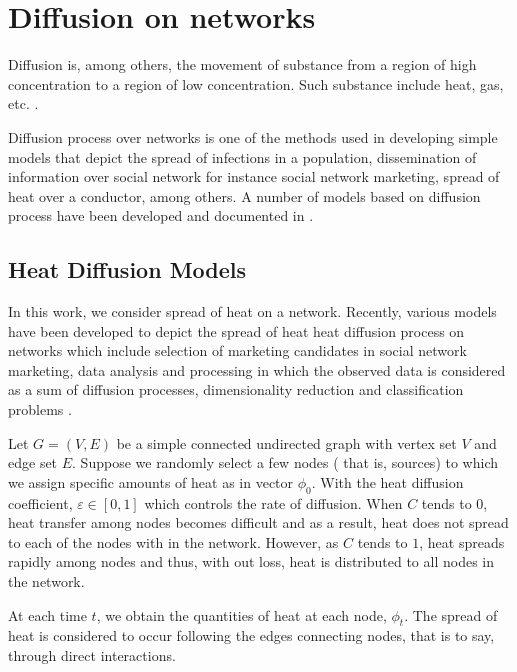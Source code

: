 \documentclass[10pt,a4paper]{article}
\begin{document}
    \section{Diffusion on networks}
    Diffusion is, among others, the movement of substance from a region of high concentration to a region of low concentration. Such substance include heat, gas, etc. \citep{newman2010networks}.
    
    Diffusion process over networks is one of the methods used in developing simple models that depict the spread of infections in a population, dissemination of information over social network for instance social network marketing, spread of heat over a conductor, among others. A number of models based on diffusion process have been developed and documented in \citep{estrada2011epidemic,kasprzak2012diffusion,lopez2008diffusion}.
    
    \subsection{Heat Diffusion Models}
    In this work, we consider spread of heat on a network. Recently, various models have been developed to depict the spread of heat heat diffusion process on networks which include selection of marketing candidates in social network marketing, data analysis and processing in which the observed data is considered as a sum of diffusion processes, dimensionality reduction and classification problems   \citep{ma2008mining,thanou2017learning,belkin2003laplacian}.
    
    Let $G=(V,E)$ be a simple connected undirected graph with vertex set $V$ and edge set $E$. Suppose we randomly select a few nodes ( that is, sources) to which we assign specific amounts of heat as in vector $\phi_0$. With the heat diffusion coefficient, $\varepsilon \in [0,1]$ which controls the rate of diffusion. When $C$ tends to $0$, heat transfer among nodes becomes difficult and as a result, heat does not spread to each of the nodes with in the network. However, as $C$ tends to $1$, heat spreads rapidly among nodes and thus, with out loss, heat is distributed to all nodes in the network.
    
   At each time $t$, we obtain the quantities of heat at each node, $\phi_t$. The spread of heat is considered to occur following the edges connecting nodes, that is to say, through direct interactions.  
    	
\end{document}
